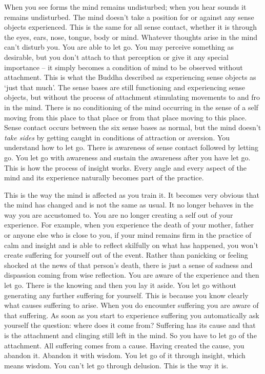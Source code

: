 When you see forms the mind remains undisturbed; when you hear sounds it remains undisturbed. The mind doesn't take a position for or against any sense objects experienced. This is the same for all sense contact, whether it is through the eyes, ears, nose, tongue, body or mind. Whatever thoughts arise in the mind can't disturb you. You are able to let go. You may perceive something as desirable, but you don't attach to that perception or give it any special importance -- it simply becomes a condition of mind to be observed without attachment. This is what the Buddha described as experiencing sense objects as `just that much'. The sense bases are still functioning and experiencing sense objects, but without the process of attachment stimulating movements to and fro in the mind. There is no conditioning of the mind occurring in the sense of a self moving from this place to that place or from that place moving to this place. Sense contact occurs between the six sense bases as normal, but the mind doesn't \textit{take sides} by getting caught in conditions of attraction or aversion. You understand how to let go. There is awareness of sense contact followed by letting go. You let go with awareness and sustain the awareness after you have let go. This is how the process of insight works. Every angle and every aspect of the mind and its experience naturally becomes part of the practice.

This is the way the mind is affected as you train it. It becomes very obvious that the mind has changed and is not the same as usual. It no longer behaves in the way you are accustomed to. You are no longer creating a self out of your experience. For example, when you experience the death of your mother, father or anyone else who is close to you, if your mind remains firm in the practice of calm and insight and is able to reflect skilfully on what has happened, you won't create suffering for yourself out of the event. Rather than panicking or feeling shocked at the news of that person's death, there is just a sense of sadness and dispassion coming from wise reflection. You are aware of the experience and then let go. There is the knowing and then you lay it aside. You let go without generating any further suffering for yourself. This is because you know clearly what causes suffering to arise. When you do encounter suffering you are aware of that suffering. As soon as you start to experience suffering you automatically ask yourself the question: where does it come from? Suffering has its cause and that is the attachment and clinging still left in the mind. So you have to let go of the attachment. All suffering comes from a cause. Having created the cause, you abandon it. Abandon it with wisdom. You let go of it through insight, which means wisdom. You can't let go through delusion. This is the way it is.

